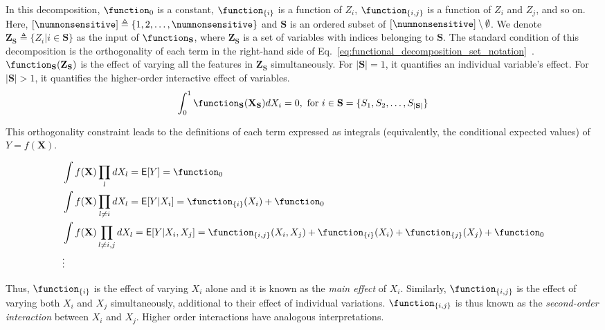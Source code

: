 In this decomposition, $ \function_0 $ is a constant, $ \function_{\{i\}} $ is a function of $ Z_i $, $ \function_{\{i,j\}} $ is a function of $ Z_i $ and $ Z_j $, and so on. Here, $ [\numnonsensitive] \triangleq \{1,2,\dots, \numnonsensitive\} $ and $ \mathbf{S}$ is an ordered subset of $[\numnonsensitive] \setminus \emptyset $.  We denote $ \mathbf{Z}_{\mathbf{S}}  \triangleq \{Z_i | i \in \mathbf{S}\}$ as the input of $ \function_{\mathbf{S}} $, where $ \mathbf{Z}_{\mathbf{S}}$ is a set of variables with indices belonging to $ \mathbf{S} $.  The standard condition of this decomposition is the orthogonality of each term in the right-hand side of Eq.~\eqref{eq:functional_decomposition_set_notation}~\cite{sobol1990sensitivity}. $ \function_{\mathbf{S}}(\mathbf{Z}_{\mathbf{S}}) $ is the effect of varying all the features in $\mathbf{Z}_{\mathbf{S}}$ simultaneously. %
For $|\mathbf{S}|=1$, it quantifies an individual variable's effect. For $|\mathbf{S}|>1$, it quantifies the higher-order interactive effect of variables.
\iffalse
\begin{align}
	\label{eq:orthogonality_in_decomposition}
	\int_{0}^{1} \function_{\mathbf{S}}(\mathbf{X}_{\mathbf{S}})dX_i = 0, \text{ for } i \in \mathbf{S} = \{S_1, S_2, \dots, S_{|\mathbf{S}|}\}
\end{align}

This orthogonality constraint leads to the definitions of each term expressed as integrals (equivalently, the conditional expected values) of $ Y = f(\mathbf{X}) $. 

\begin{align*}
	&\int f(\mathbf{X})\prod_l dX_l =  \mathsf{E}[Y] = \function_0\\
	&\int f(\mathbf{X})\prod_{l \ne i} dX_l =  \mathsf{E}[Y|X_i] = \function_{\{i\}}(X_i) + \function_0\\
	&\int f(\mathbf{X})\prod_{l \ne i, j} dX_l = \mathsf{E}[Y|X_i, X_j] = \function_{\{i,j\}}(X_i, X_j)  +  \function_{\{i\}}(X_i) +  \function_{\{j\}}(X_j) + \function_0 \\
	&\vdots
\end{align*}

Thus, $ \function_{\{i\}} $ is the effect of varying $ X_i $ alone and it is known as the \emph{main effect} of $ X_i $. Similarly, $ \function_{\{i,j\}} $ is the effect of varying both $ X_i $ and $ X_j $ simultaneously, additional to their effect of individual variations. $ \function_{\{i,j\}} $ is thus known as the \emph{second-order interaction} between $ X_i $ and $ X_j $. Higher order interactions have analogous interpretations. 


